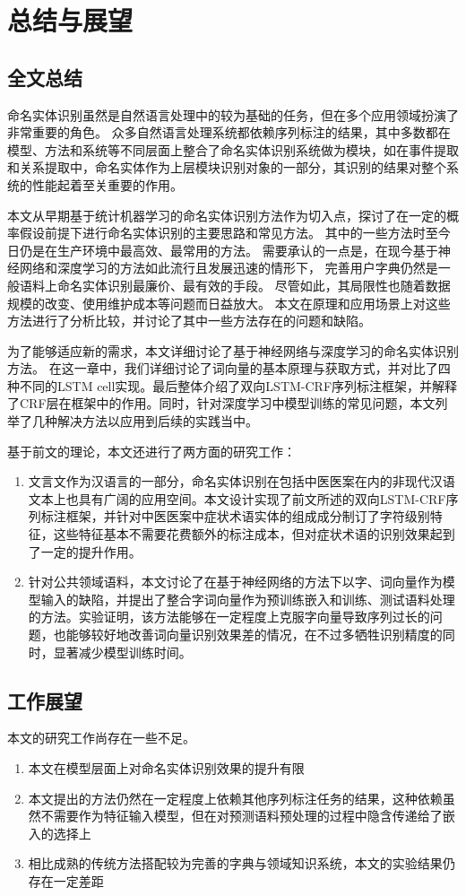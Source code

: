 \chapter{总结与展望}
\section{全文总结}
命名实体识别虽然是自然语言处理中的较为基础的任务，但在多个应用领域扮演了非常重要的角色。
众多自然语言处理系统都依赖序列标注的结果，其中多数都在模型、方法和系统等不同层面上整合了命名实体识别系统做为模块，如在事件提取和关系提取中，命名实体作为上层模块识别对象的一部分，其识别的结果对整个系统的性能起着至关重要的作用。

本文从早期基于统计机器学习的命名实体识别方法作为切入点，探讨了在一定的概率假设前提下进行命名实体识别的主要思路和常见方法。
其中的一些方法时至今日仍是在生产环境中最高效、最常用的方法。
需要承认的一点是，在现今基于神经网络和深度学习的方法如此流行且发展迅速的情形下，
完善用户字典仍然是一般语料上命名实体识别最廉价、最有效的手段。
尽管如此，其局限性也随着数据规模的改变、使用维护成本等问题而日益放大。
本文在原理和应用场景上对这些方法进行了分析比较，并讨论了其中一些方法存在的问题和缺陷。

为了能够适应新的需求，本文详细讨论了基于神经网络与深度学习的命名实体识别方法。
在这一章中，我们详细讨论了词向量的基本原理与获取方式，并对比了四种不同的LSTM cell实现。最后整体介绍了双向LSTM-CRF序列标注框架，并解释了CRF层在框架中的作用。同时，针对深度学习中模型训练的常见问题，本文列举了几种解决方法以应用到后续的实践当中。

基于前文的理论，本文还进行了两方面的研究工作：
\begin{enumerate}
    \item 文言文作为汉语言的一部分，命名实体识别在包括中医医案在内的非现代汉语文本上也具有广阔的应用空间。本文设计实现了前文所述的双向LSTM-CRF序列标注框架，并针对中医医案中症状术语实体的组成成分制订了字符级别特征，这些特征基本不需要花费额外的标注成本，但对症状术语的识别效果起到了一定的提升作用。
    \item 针对公共领域语料，本文讨论了在基于神经网络的方法下以字、词向量作为模型输入的缺陷，并提出了整合字词向量作为预训练嵌入和训练、测试语料处理的方法。实验证明，该方法能够在一定程度上克服字向量导致序列过长的问题，也能够较好地改善词向量识别效果差的情况，在不过多牺牲识别精度的同时，显著减少模型训练时间。
\end{enumerate}

\section{工作展望}
本文的研究工作尚存在一些不足。
\begin{enumerate}
    \item 本文在模型层面上对命名实体识别效果的提升有限
    \item 本文提出的方法仍然在一定程度上依赖其他序列标注任务的结果，这种依赖虽然不需要作为特征输入模型，但在对预测语料预处理的过程中隐含传递给了嵌入的选择上
    \item 相比成熟的传统方法搭配较为完善的字典与领域知识系统，本文的实验结果仍存在一定差距
\end{enumerate}

